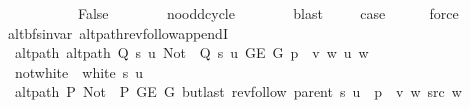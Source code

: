 \begin{isabellebody}
\ \ \ \ \isamarkupfalse%
\isanewline
\ \ \ \ \isamarkupfalse%
\ \isamarkupfalse%
\ False\isanewline
\ \ \ \ \ \ \isamarkupfalse%
\ no{\isacharunderscore}{\kern0pt}odd{\isacharunderscore}{\kern0pt}cycle\isanewline
\ \ \ \ \ \ \isamarkupfalse%
\ blast\ \isacommand{{\isacharbraceright}{\kern0pt}}\isamarkupfalse%
\isanewline
\ \ \isamarkupfalse%
\ {\isacharquery}{\kern0pt}case\isanewline
\ \ \ \ \isamarkupfalse%
\ force\isanewline
{}\isamarkupfalse%
%
\endisatagproof
{\isafoldproof}%
%
\isadelimproof
\isanewline
%
\endisadelimproof
\isanewline
{}\isamarkupfalse%
\ {\isacharparenleft}{\kern0pt}\ alt{\isacharunderscore}{\kern0pt}bfs{\isacharunderscore}{\kern0pt}invar{\isacharparenright}{\kern0pt}\ alt{\isacharunderscore}{\kern0pt}path{\isacharunderscore}{\kern0pt}rev{\isacharunderscore}{\kern0pt}follow{\isacharunderscore}{\kern0pt}appendI{\isacharcolon}{\kern0pt}\isanewline
\ \ \ alt{\isacharunderscore}{\kern0pt}path{\isacharcolon}{\kern0pt}\ {\isachardoublequoteopen}alt{\isacharunderscore}{\kern0pt}path\ {\isacharparenleft}{\kern0pt}Q\ s\ u{\isacharparenright}{\kern0pt}\ {\isacharparenleft}{\kern0pt}Not\ {\isasymcirc}\ Q\ s\ u{\isacharparenright}{\kern0pt}\ {\isacharparenleft}{\kern0pt}G{\isachardot}{\kern0pt}E\ G{\isacharparenright}{\kern0pt}\ {\isacharparenleft}{\kern0pt}p\ {\isacharat}{\kern0pt}\ {\isacharbrackleft}{\kern0pt}v{\isacharcomma}{\kern0pt}\ w{\isacharbrackright}{\kern0pt}{\isacharparenright}{\kern0pt}\ u\ w{\isachardoublequoteclose}\isanewline
\ \ \ not{\isacharunderscore}{\kern0pt}white{\isacharcolon}{\kern0pt}\ {\isachardoublequoteopen}{\isasymnot}\ white\ s\ u{\isachardoublequoteclose}\isanewline
\ \ \ {\isachardoublequoteopen}alt{\isacharunderscore}{\kern0pt}path\ P{\isacharprime}{\kern0pt}{\isacharprime}{\kern0pt}\ {\isacharparenleft}{\kern0pt}Not\ {\isasymcirc}\ P{\isacharprime}{\kern0pt}{\isacharprime}{\kern0pt}{\isacharparenright}{\kern0pt}\ {\isacharparenleft}{\kern0pt}G{\isachardot}{\kern0pt}E\ G{\isacharparenright}{\kern0pt}\ {\isacharparenleft}{\kern0pt}butlast\ {\isacharparenleft}{\kern0pt}rev{\isacharunderscore}{\kern0pt}follow\ {\isacharparenleft}{\kern0pt}parent\ s{\isacharparenright}{\kern0pt}\ u{\isacharparenright}{\kern0pt}\ {\isacharat}{\kern0pt}\ p\ {\isacharat}{\kern0pt}\ {\isacharbrackleft}{\kern0pt}v{\isacharcomma}{\kern0pt}\ w{\isacharbrackright}{\kern0pt}{\isacharparenright}{\kern0pt}\ src\ w{\isachardoublequoteclose}\isanewline

\end{isabellebody}
